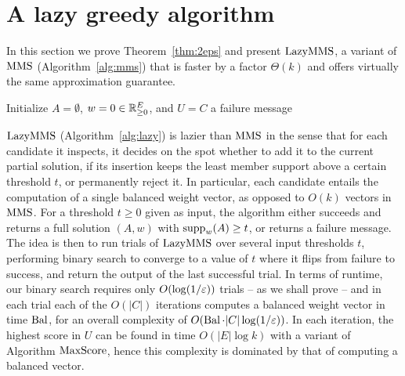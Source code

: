 \section{A lazy greedy algorithm}\label{s:lazymms}

In this section we prove Theorem~\ref{thm:2eps} and present $\lazy$, a variant of $\operatorname{MMS}$ (Algorithm~\ref{alg:mms}) that is faster by a factor $\Theta(k)$ and offers virtually the same approximation guarantee.

\begin{algorithm}[htb]
\SetAlgoLined
{}
Initialize $A=\emptyset$, $w=0\in\mathbb{R}_{\geq 0}^E$, and $U=C$ \;
\Return a failure message\;
\caption{$\lazy$}
\label{alg:lazy}
\end{algorithm}

$\lazy$ (Algorithm~\ref{alg:lazy}) is lazier than $\operatorname{MMS}$ in the sense that for each candidate it inspects, it decides on the spot whether to add it to the current partial solution, if its insertion keeps the least member support above a certain threshold $t$, or permanently reject it. In particular, each candidate entails the computation of a single balanced weight vector, as opposed to $O(k)$ vectors in $\operatorname{MMS}$. 
For a threshold $t\geq 0$ given as input, the algorithm either succeeds and returns a full solution $(A,w)$ with $\operatorname{supp}_w(A)\geq t$, or returns a failure message. 
The idea is then to run trials of $\lazy$ over several input thresholds $t$, performing binary search to converge to a value of $t$ where it flips from failure to success, and return the output of the last successful trial. 
In terms of runtime, our binary search requires only $O(\log (1/\varepsilon))$ trials -- as we shall prove -- and in each trial each of the $O(|C|)$ iterations computes a balanced weight vector in time $\operatorname{Bal}$, for an overall complexity of $O(\operatorname{Bal}\cdot |C| \log (1/\varepsilon))$. 
In each iteration, the highest score in $U$ can be found in time $O(|E|\log k)$ with a variant of Algorithm $\operatorname{MaxScore}$, hence this complexity is dominated by that of computing a balanced vector.  


